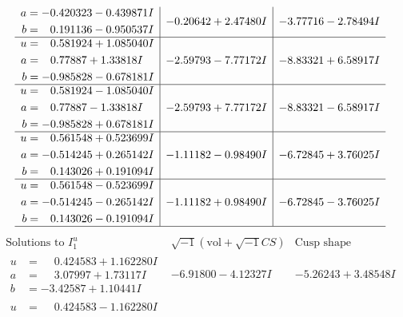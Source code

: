 \documentclass[1p]{elsarticle_modified}
\theoremstyle{definition}
\newcommand{\I}{\sqrt{-1}}
\begin{document}
$$\begin{array}{c|c|c}
\begin{aligned}
a &= -0.420323 - 0.439871 I \\
b &= \phantom{-}0.191136 - 0.950537 I\end{aligned}
 & -0.20642 + 2.47480 I & -3.77716 - 2.78494 I \\ \hline\begin{aligned}
u &= \phantom{-}0.581924 + 1.085040 I \\
a &= \phantom{-}0.77887 + 1.33818 I \\
b &= -0.985828 - 0.678181 I\end{aligned}
 & -2.59793 - 7.77172 I & -8.83321 + 6.58917 I \\ \hline\begin{aligned}
u &= \phantom{-}0.581924 - 1.085040 I \\
a &= \phantom{-}0.77887 - 1.33818 I \\
b &= -0.985828 + 0.678181 I\end{aligned}
 & -2.59793 + 7.77172 I & -8.83321 - 6.58917 I \\ \hline\begin{aligned}
u &= \phantom{-}0.561548 + 0.523699 I \\
a &= -0.514245 + 0.265142 I \\
b &= \phantom{-}0.143026 + 0.191094 I\end{aligned}
 & -1.11182 - 0.98490 I & -6.72845 + 3.76025 I \\ \hline\begin{aligned}
u &= \phantom{-}0.561548 - 0.523699 I \\
a &= -0.514245 - 0.265142 I \\
b &= \phantom{-}0.143026 - 0.191094 I\end{aligned}
 & -1.11182 + 0.98490 I & -6.72845 - 3.76025 I\\
 \hline 
 \end{array}$$\newpage$$\begin{array}{c|c|c}  
\text{Solutions to }I^u_{1}& \I (\text{vol} + \sqrt{-1}CS) & \text{Cusp shape}\\
 \hline 
\begin{aligned}
u &= \phantom{-}0.424583 + 1.162280 I \\
a &= \phantom{-}3.07997 + 1.73117 I \\
b &= -3.42587 + 1.10441 I\end{aligned}
 & -6.91800 - 4.12327 I & -5.26243 + 3.48548 I \\ \hline\begin{aligned}
u &= \phantom{-}0.424583 - 1.162280 I \\

\end{aligned}
\end{array}$$
\end{document}
